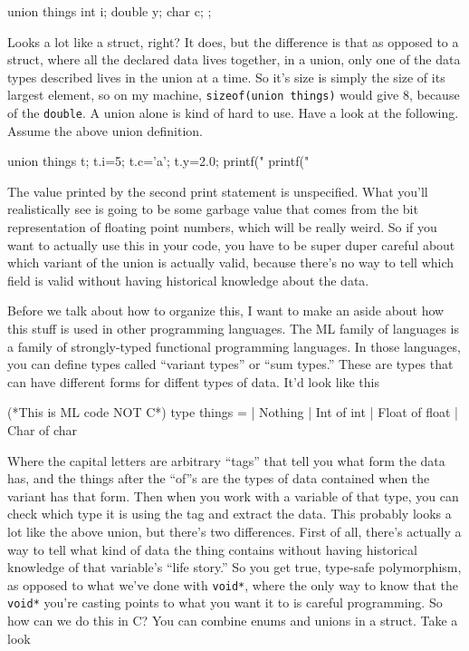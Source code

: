 \documentclass[ebook,11pt,oneside,openany]{memoir}
\newcommand{\cf}[1]{\texttt{#1}}
\begin{document}
\begin{code}[language=C]
union things {
  int i;
  double y;
  char c;
};
\end{code}

Looks a lot like a struct, right? It does, but the difference is that as opposed to a struct, where all the declared data lives together, in a union, only one of the data types described lives in the union at a time. So it's size is simply the size of its largest element, so on my machine, \cf{sizeof(union things)} would give 8, because of the \cf{double}. A union alone is kind of hard to use. Have a look at the following. Assume the above union definition.

\begin{code}[language=C]
union things t;
t.i=5;
t.c='a';
t.y=2.0;
printf("%
printf("%
\end{code}

The value printed by the second print statement is unspecified. What you'll realistically see is going to be some garbage value that comes from the bit representation of floating point numbers, which will be really weird. So if you want to actually use this in your code, you have to be super duper careful about which variant of the union is actually valid, because there's no way to tell which field is valid without having historical knowledge about the data.

Before we talk about how to organize this, I want to make an aside about how this stuff is used in other programming languages. The ML family of languages is a family of strongly-typed functional programming languages. In those languages, you can define types called ``variant types'' or ``sum types.'' These are types that can have different forms for diffent types of data. It'd look like this

\begin{code}[language=ML]
(*This is ML code NOT C*)
type things = 
| Nothing
| Int of int
| Float of float 
| Char of char
\end{code}

Where the capital letters are arbitrary ``tags'' that tell you what form the data has, and the things after the ``of''s are the types of data contained when the variant has that form. Then when you work with a variable of that type, you can check which type it is using the tag and extract the data. This probably looks a lot like the above union, but there's two differences. First of all, there's actually a way to tell what kind of data the thing contains without having historical knowledge of that variable's ``life story.'' So you get true, type-safe polymorphism, as opposed to what we've done with \cf{void*}, where the only way to know that the \cf{void*} you're casting points to what you want it to is careful programming. So how can we do this in C? You can combine enums and unions in a struct. Take a look
\end{document}
